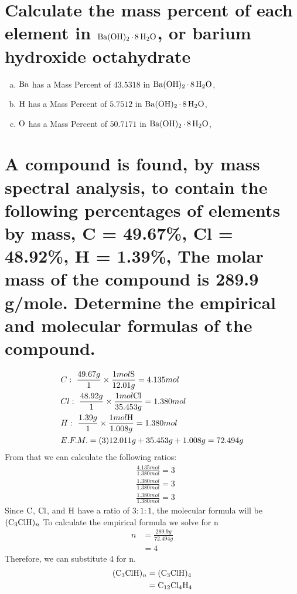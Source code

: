 \documentclass[11pt]{article}
\begin{document}
\section{Calculate the mass percent of each element in \(\ce{Ba(OH)2*8H2O}\), or barium hydroxide octahydrate}
\label{sec:orgdb6f741}
\begin{enumerate}[(a)]
\item \(\ce{Ba}\)  has a Mass Percent of \(43.5318\) in \(\ce{Ba(OH)2*8H2O}\),
\item \(\ce{H}\)  has a Mass Percent of \(5.7512\) in \(\ce{Ba(OH)2*8H2O}\),
\item \(\ce{O}\)  has a Mass Percent of \(50.7171\) in \(\ce{Ba(OH)2*8H2O}\),
\end{enumerate}

\section{A compound is found, by mass spectral analysis, to contain the following percentages of elements by mass, C = 49.67\%, Cl = 48.92\%, H = 1.39\%, The molar mass of the compound is 289.9 g/mole. Determine the empirical and molecular formulas of the compound.}
\label{sec:org5023aa1}
\begin{align*}
&C:\ \frac{49.67g}{1}\times\frac{1mol\ce{S}}{12.01g}=4.135mol\\
&Cl:\ \frac{48.92g}{1}\times\frac{1mol\ce{Cl}}{35.453g}=1.380mol\\
&H:\ \frac{1.39g}{1}\times\frac{1mol\ce{H}}{1.008g}=1.380mol\\
&E.F.M.=(3)12.011g+35.453g+1.008g=72.494g
\end{align*}
From that we can calculate the following ratios:
\begin{align*}
&\frac{4.135mol}{1.380mol}=3\\
&\frac{1.380mol}{1.380mol}=3\\
&\frac{1.380mol}{1.380mol}=3
\end{align*}
Since \(\ce{C}\), \(\ce{Cl}\), and  \(\ce{H}\) have a ratio of \(3:1:1\), the molecular formula will be \(\ce{(C3ClH)_n}\) To calculate the empirical formula we solve for n
\begin{align*}
n&=\frac{289.9g}{72.494g}\\
&=4
\end{align*}
Therefore, we can substitute 4 for n.
\begin{align*}
\ce{(C3ClH)_n}&=\ce{(C3ClH)4}\\
&=\ce{C12Cl4H4}
\end{align*}
\end{document}
